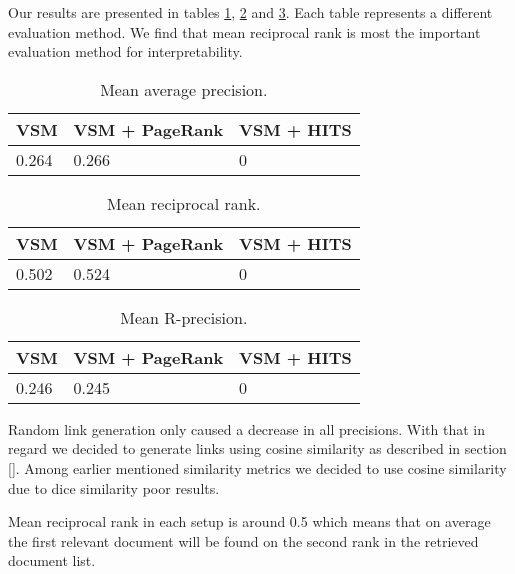 \documentclass[10pt, a4paper]{article}
\begin{document}
Our results are presented in tables \ref{tab:MAP}, \ref{tab:MRR} and \ref{tab:MR}. Each table represents a different evaluation method. We find that mean reciprocal rank is most the important evaluation method for interpretability.

\begin{table}
\caption{Mean average precision.}
\label{tab:MAP}
\begin{center}
\begin{tabular}{lll}
\toprule
VSM & VSM + PageRank & VSM + HITS \\
\midrule
0.264 & 0.266 & 0\\
\bottomrule
\end{tabular}
\end{center}
\end{table}

\begin{table}
\caption{Mean reciprocal rank.}
\label{tab:MRR}
\begin{center}
\begin{tabular}{lll}
\toprule
VSM & VSM + PageRank & VSM + HITS \\
\midrule
0.502 & 0.524 & 0\\
\bottomrule
\end{tabular}
\end{center}
\end{table}

\begin{table}
\caption{Mean R-precision.}
\label{tab:MR}
\begin{center}
\begin{tabular}{lll}
\toprule
VSM & VSM + PageRank & VSM + HITS \\
\midrule
0.246 & 0.245 & 0\\
\bottomrule
\end{tabular}
\end{center}
\end{table}

Random link generation only caused a decrease in all precisions. With that in regard we decided to generate links using cosine similarity as described in section \ref{}. Among earlier mentioned similarity metrics we decided to use cosine similarity due to dice similarity poor results.

Mean reciprocal rank in each setup is around 0.5 which means that on average the first relevant document will be found on the second rank in the retrieved document list.
\end{document}
